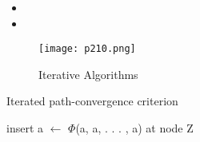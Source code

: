 \begin{itemize}
    \item 
    \item
\end{itemize}  


\begin{figure}[H]
    \centering
    \texttt{[image: p210.png]}
    \caption{Iterative Algorithms}
    \label{fig:p210}
\end{figure}




\begin{algorithm}
    \caption{Iterated path-convergence criterion}\label{alg:Iterated path-convergence criterion}
    \begin{algorithmic}
    
    \State  insert a $\leftarrow$ $\Phi$(a, a, . . . , a) at node Z
    \EndWhile
    \end{algorithmic}
    \end{algorithm}